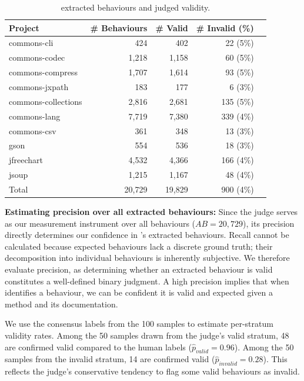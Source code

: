 \begin{table}[h]
\centering
\caption{\toolname{} extracted behaviours and judged validity.}
\label{tab:method_behaviour_counts}
\begin{tabular}{lrrrr}
\toprule
\textbf{Project} & \textbf{\# Behaviours} & \textbf{\# Valid} & \textbf{\# Invalid (\%)} \\
\midrule
commons-cli         & 424 & 402 & 22 (5\%)\\
commons-codec       & 1,218 & 1,158 & 60 (5\%) \\
commons-compress    & 1,707 & 1,614 & 93 (5\%) \\
commons-jxpath      & 183 & 177 & 6 (3\%) \\
commons-collections & 2,816 & 2,681 & 135 (5\%) \\
commons-lang        & 7,719 & 7,380 & 339 (4\%)\\
commons-csv         & 361 & 348 & 13 (3\%) \\
gson                & 554 & 536 & 18 (3\%) \\
jfreechart          & 4,532 & 4,366 & 166 (4\%) \\
jsoup               & 1,215 & 1,167 & 48 (4\%) \\
\midrule
Total               & 20,729 & 19,829 & 900 (4\%) \\
\bottomrule
\end{tabular}
\end{table}

\smallskip
\noindent\textbf{Estimating precision over all extracted behaviours:}
Since the judge serves as our measurement instrument over all behaviours ($AB=20,729$), its precision directly determines our confidence in \toolname{}'s extracted behaviours.
Recall cannot be calculated because expected behaviours lack a discrete ground truth; their decomposition into individual behaviours is inherently subjective. 
We therefore evaluate precision, as determining whether an extracted behaviour is valid constitutes a well-defined binary judgment.
A high precision implies that when \toolname identifies a behaviour, we can be confident it is valid and expected given a method and its documentation. 

We use the consensus labels from the 100 samples to estimate per-stratum validity rates.
Among the 50 samples drawn from the judge's valid stratum, 48 are confirmed valid compared to the human labels ($\hat{p}_{valid} = 0.96$). 
Among the 50 samples from the invalid stratum, 14 are confirmed valid ($\hat{p}_{invalid} = 0.28$). This reflects the judge's conservative tendency to flag some valid behaviours as invalid. 

